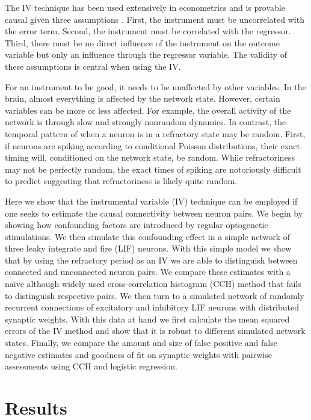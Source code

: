 \documentclass[11pt]{article}
\begin{document}
The IV technique has been used extensively in econometrics and is provable causal given three assumptions \citep{angrist2008mostly}. First, the instrument must be uncorrelated with the error term. Second, the instrument must be correlated with the regressor. Third, there must be no direct influence of the instrument on the outcome variable but only an influence through the regressor variable. The validity of these assumptions is central when using the IV.

For an instrument to be good, it needs to be unaffected by other variables. In the brain, almost everything is affected by the network state. However, certain variables can be more or less affected. For example, the overall activity of the network is through slow and strongly nonrandom dynamics. In contrast, the temporal pattern of when a neuron is in a refractory state may be random. First, if neurons are spiking according to conditional Poisson distributions, their exact timing will, conditioned on the network state, be random. While refractoriness may not be perfectly random, the exact times of spiking are notoriously difficult to predict \citep{stevenson2008inferring} suggesting that refractoriness is likely quite random.

Here we show that the instrumental variable (IV) technique can be employed if one seeks to estimate the causal connectivity between neuron pairs. We begin by showing how confounding factors are introduced by regular optogenetic stimulations. We then simulate this confounding effect in a simple network of three leaky integrate and fire (LIF) neurons. With this simple model we show that by using the refractory period as an IV we are able to distinguish between connected and unconnected neuron pairs. We compare these estimates with a naive although widely used cross-correlation histogram (CCH) method that fails to distinguish respective pairs. We then turn to a simulated network of randomly recurrent connections of excitatory and inhibitory LIF neurons with distributed synaptic weights. With this data at hand we first calculate the mean squared errors of the IV method and show that it is robust to different simulated network states. Finally, we compare the amount and size of false positive and false negative estimates and goodness of fit on synaptic weights with pairwise assessments using CCH and logistic regression.

\section{Results}
\end{document}
